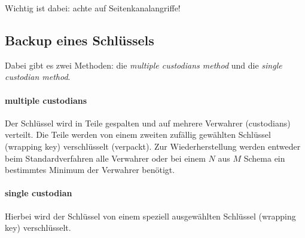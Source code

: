 Wichtig ist dabei: achte auf Seitenkanalangriffe!

\subsection{Backup eines Schlüssels}%
\label{sub:backup_eines_schlussels}

Dabei gibt es zwei Methoden:
die \emph{multiple custodians method}
und die \emph{single custodian method}.

\paragraph{multiple custodians}%
\label{par:multiple_custodians}

Der Schlüssel wird in Teile gespalten und auf mehrere Verwahrer (custodians) verteilt.
Die Teile werden von einem zweiten zufällig gewählten Schlüssel (wrapping key)
verschlüsselt (verpackt).
Zur Wiederherstellung werden entweder beim Standardverfahren alle Verwahrer
oder bei einem $N$ aus $M$ Schema ein bestimmtes Minimum der Verwahrer benötigt.

\paragraph{single custodian}%
\label{par:single_custodian}

Hierbei wird der Schlüssel von einem speziell ausgewählten Schlüssel (wrapping key)
verschlüsselt.
